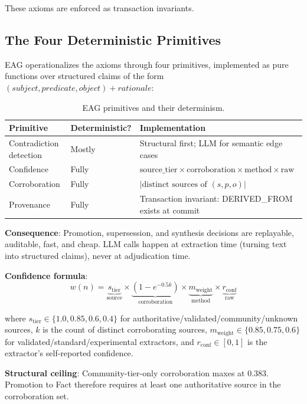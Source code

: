 \documentclass[11pt,letterpaper]{article}
\begin{document}
These axioms are enforced as transaction invariants.

\subsection{The Four Deterministic Primitives}

EAG operationalizes the axioms through four primitives, implemented as pure functions over structured claims of the form $(subject, predicate, object) + rationale$:

\begin{table}[H]
\centering
\caption{EAG primitives and their determinism.}
\label{tab:primitives}
\begin{tabular}{@{}lll@{}}
\toprule
\textbf{Primitive} & \textbf{Deterministic?} & \textbf{Implementation} \\
\midrule
Contradiction detection & Mostly & Structural first; LLM for semantic edge cases \\
Confidence & Fully & $\text{source\_tier} \times \text{corroboration} \times \text{method} \times \text{raw}$ \\
Corroboration & Fully & $|\text{distinct sources of } (s, p, o)|$ \\
Provenance & Fully & Transaction invariant: DERIVED\_FROM exists at commit \\
\bottomrule
\end{tabular}
\end{table}

\textbf{Consequence}: Promotion, supersession, and synthesis decisions are replayable, auditable, fast, and cheap. LLM calls happen at extraction time (turning text into structured claims), never at adjudication time.

\textbf{Confidence formula}:
\[
w(n) = \underbrace{s_{\text{tier}}}_{\text{source}} \times \underbrace{(1 - e^{-0.5k})}_{\text{corroboration}} \times \underbrace{m_{\text{weight}}}_{\text{method}} \times \underbrace{r_{\text{conf}}}_{\text{raw}}
\]

where $s_{\text{tier}} \in \{1.0, 0.85, 0.6, 0.4\}$ for authoritative/validated/community/unknown sources, $k$ is the count of distinct corroborating sources, $m_{\text{weight}} \in \{0.85, 0.75, 0.6\}$ for validated/standard/experimental extractors, and $r_{\text{conf}} \in [0,1]$ is the extractor's self-reported confidence.

\textbf{Structural ceiling}: Community-tier-only corroboration maxes at 0.383. Promotion to Fact therefore requires at least one authoritative source in the corroboration set.
\end{document}
